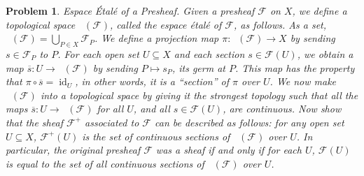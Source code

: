 \documentclass[12pt,letterpaper]{article}
\newtheorem{problem}{Problem}[section]
\theoremstyle{definition}
\theoremstyle{remark}
\numberwithin{equation}{section}
\numberwithin{figure}{problem}
\DeclareMathOperator{\id}{id}
\DeclareMathOperator{\Spe}{Sp\acute{e}}
\begin{document}
\begin{problem}
  \emph{Espace \'Etal\'e of a Presheaf}. Given a presheaf $\mathscr{F}$ on $X$, we define a topological space $\Spe(\mathscr{F})$, called the \emph{espace \'etal\'e} of $\mathscr{F}$, as follows. As a set, $\Spe(\mathscr{F}) = \bigcup_{P\in X} \mathscr{F}_P$. We define a projection map $\pi\colon\Spe(\mathscr{F}) \to X$ by sending $s \in \mathscr{F}_P$ to $P$. For each open set $U \subseteq X$ and each section $s \in \mathscr{F}(U)$, we obtain a map $\overline{s}\colon U \to \Spe(\mathscr{F})$ by sending $P \mapsto s_P$, its germ at $P$. This map has the property that $\pi \circ \overline{s} = \id_U$, in other words, it is a ``section'' of $\pi$ over $U$. We now make $\Spe(\mathscr{F})$ into a topological space by giving it the strongest topology such that all the maps $\overline{s}\colon U \to \Spe(\mathscr{F})$ for all $U$, and all $s \in \mathscr{F}(U)$, are continuous. Now show that the sheaf $\mathscr{F}^+$ associated to $\mathscr{F}$ can be described as follows: for any open set $U \subseteq X$, $\mathscr{F}^+(U)$ is the set of \emph{continuous} sections of $\Spe(\mathscr{F})$ over $U$. In particular, the original presheaf $\mathscr{F}$ was a sheaf if and only if for each $U$, $\mathscr{F}(U)$ is equal to the set of all continuous sections of $\Spe(\mathscr{F})$ over $U$.
\end{problem}
\end{document}
